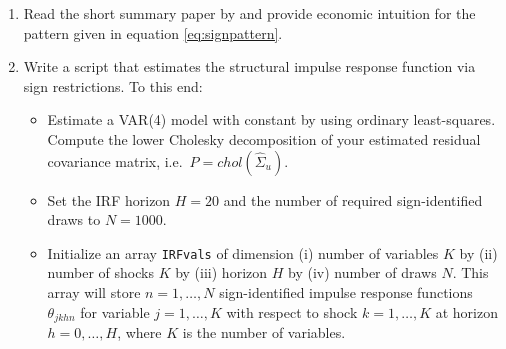 \documentclass{article}
\begin{document}
\begin{enumerate}
\item Read the short summary paper by \textcite{Wolf_2022_WhatCanWe} and provide economic intuition for the pattern given in equation \eqref{eq:signpattern}.
\item Write a script that estimates the structural impulse response function via sign restrictions.
To this end:
	\begin{itemize}
	\item Estimate a VAR{(4)} model with constant by using ordinary least-squares.
	Compute the lower Cholesky decomposition of your estimated residual covariance matrix, i.e.\ \( P = chol(\hat{\Sigma}_u) \).
	\item Set the IRF horizon \(H=20\) and the number of required sign-identified draws to \(N=1000\).
	\item Initialize an array \texttt{IRFvals} of dimension
	(i) number of variables \(K\) by (ii) number of shocks \(K\) by (iii) horizon \(H\) by (iv) number of draws \(N\).
	This array will store \(n=1,\ldots,N\) sign-identified impulse response functions \(\theta_{jkhn}\) for variable \(j=1,\ldots,K\)
	with respect to shock \(k=1,\ldots,K\) at horizon \(h=0,\ldots,H\), where \(K\) is the number of variables.


\end{itemize}
\end{enumerate}
\end{document}
